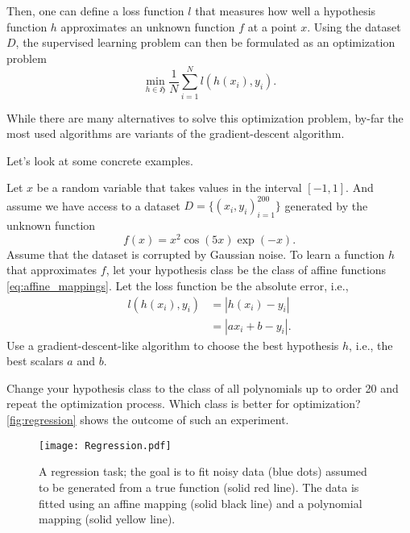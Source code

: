 Then, one can define a loss function $l$ that measures how well a hypothesis
function $h$ approximates an unknown function $f$ at a point $x$. Using the
dataset $D$, the supervised learning
problem can then be formulated as an optimization problem 
\begin{equation}
    \min_{h \in \mathfrak{H}} \frac{1}{N}\sum_{i=1}^{N}l(h(x_i), y_i).
\end{equation}

While there are many alternatives to solve this optimization problem,
by-far the most used algorithms are variants of the gradient-descent algorithm. 

Let's look at some concrete examples. 

\begin{boxedexample}[Regression] \complementary{\theexample}
    \label{ex:regression}
    Let $x$ be a random variable that takes values in the interval $[-1,1]$. And assume we
    have access to a dataset $D = \{(x_i, y_i)_{i=1}^{200}\}$ generated by the unknown
    function 
    $$
    f(x) = x^2 \cos(5x) \exp(-x).
    $$ 
    Assume that the dataset is corrupted by Gaussian noise.
    To learn a function $h$ that approximates $f$, let your hypothesis class be
    the class of affine functions \eqref{eq:affine_mappings}. Let the loss
    function be the absolute error, i.e., 
    \begin{align*}
    l(h(x_i), y_i) &= |h(x_i)- y_i| \\
& = |ax_i + b - y_i|.
    \end{align*}
    Use a gradient-descent-like algorithm to choose the best hypothesis $h$,
    i.e., the best scalars $a$ and $b$. 

    Change your hypothesis class to the class of all polynomials up to   order
    20 and repeat the optimization process. Which class is better for
    optimization? \autoref{fig:regression} shows the outcome of such an experiment.
\end{boxedexample}
\begin{figure}[htbp]
    \centering
    \texttt{[image: Regression.pdf]}
    \caption{A regression task; the goal is to fit noisy data (blue dots) assumed to be generated from a true function (solid red line). The data is fitted using an affine mapping (solid black line) and a polynomial mapping (solid yellow line).}
    \label{fig:regression}
\end{figure}   

